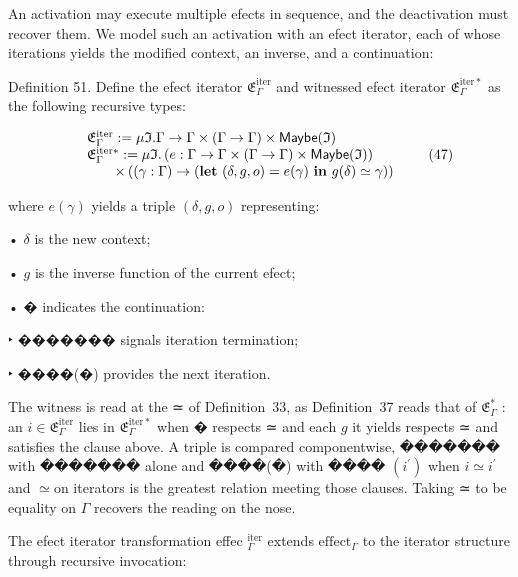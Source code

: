 \documentclass[
  10
]{article}
\begin{document}
An activation may execute multiple efects in sequence, and the
deactivation must recover them. We model such an activation with an
efect iterator, each of whose iterations yields the modified context, an
inverse, and a continuation:

Definition 51. Define the efect iterator
\({ \mathfrak { E } } _ { \Gamma } ^ { \mathrm { i t e r } }\) and
witnessed efect iterator
\(\mathfrak { E } _ { \Gamma } ^ { \mathrm { i t e r * } }\) as the
following recursive types:

\[
\begin{array} { r l } & { \mathfrak { E } _ { \Gamma } ^ { \mathrm { i t e r } } : = \mu \mathfrak { I } . \Gamma \to \Gamma \times ( \Gamma \to \Gamma ) \times \mathsf { M a y b e } ( \mathfrak { I } ) } \\ & { \mathfrak { E } _ { \Gamma } ^ { \mathrm { i t e r } * } : = \mu \mathfrak { I } . \left( e : \Gamma \to \Gamma \times ( \Gamma \to \Gamma ) \times \mathsf { M a y b e } ( \mathfrak { I } ) \right) } \\ & { \qquad \times \left( ( \gamma : \Gamma ) \to ( \mathbf { l e t } \ ( \delta , g , o ) = e ( \gamma ) \ \mathbf { i n } \ g ( \delta ) \simeq \gamma ) \right) } \end{array}\tag{47}
\]

where \(e ( \gamma )\) yields a triple \(( \delta , g , o )\)
representing:

• \(\delta\) is the new context;

• \(g\) is the inverse function of the current efect;

• � indicates the continuation:

‣ ������� signals iteration termination;

‣ ����(�) provides the next iteration.

The witness is read at the ≃ of Definition~33, as Definition~37 reads
that of \({ \mathfrak { E } } _ { \Gamma } ^ { * }\) : an
\(i \in { \mathfrak { E } } _ { \Gamma } ^ { \mathrm { i t e r } }\)
lies in \({ \mathfrak { E } } _ { \Gamma } ^ { \mathrm { i t e r * } }\)
when � respects ≃ and each \(g\) it yields respects ≃ and satisfies the
clause above. A triple is compared componentwise, ������� with �������
alone and ����(�) with ���� \(( i ^ { \prime } )\) when
\(i \simeq i ^ { \prime }\) and \(\simeq \mathrm { o n }\) iterators is
the greatest relation meeting those clauses. Taking ≃ to be equality on
\(\Gamma\) recovers the reading on the nose.

The efect iterator transformation effec
\(^ { \mathrm { i t e r } } _ { \Gamma }\) extends
\(\mathrm { e f f e c t } _ { \Gamma }\) to the iterator structure
through recursive invocation:
\end{document}
